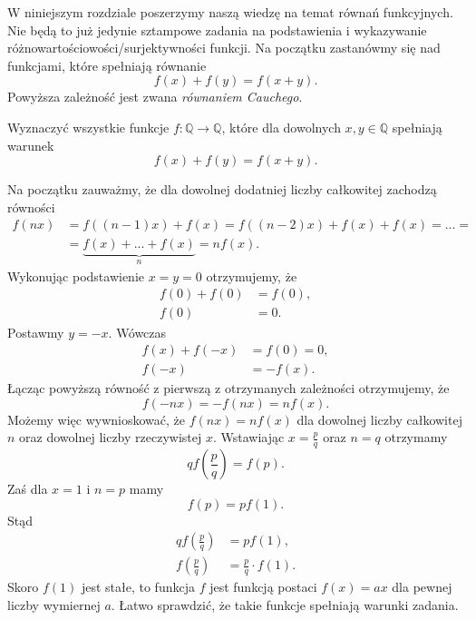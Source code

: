 

\noindent
W niniejszym rozdziale poszerzymy naszą wiedzę na temat równań funkcyjnych. Nie będą to już jedynie sztampowe zadania na podstawienia i wykazywanie różnowartościowości/surjektywności funkcji. Na początku zastanówmy się nad funkcjami, które spełniają równanie
\[
	f(x) + f(y) = f(x + y).
\]
Powyższa zależność jest zwana \textit{równaniem Cauchego}.

\vspace{10px}


\noindent
Wyznaczyć wszystkie funkcje $f:\mathbb{Q}\longrightarrow\mathbb{Q}$, które dla dowolnych $x, y \in \mathbb{Q}$ spełniają warunek
\[
	f(x) + f(y) = f(x + y).
\]


\noindent
Na początku zauważmy, że dla dowolnej dodatniej liczby całkowitej zachodzą równości
\begin{align*}
	f(nx) &= f((n - 1)x) + f(x) = f((n - 2)x) + f(x) + f(x) = ... = \\
	&=  \underbrace{f(x) + ... + f(x)}_{n} = nf(x).
\end{align*}
Wykonując podstawienie $x = y = 0$ otrzymujemy, że
\begin{align*}
	f(0) + f(0) &= f(0), \\
	f(0) &= 0.
\end{align*}
Postawmy $y = -x$. Wówczas
\begin{align*}
	f(x) + f(-x) &= f(0) = 0, \\
	f(-x) &= -f(x).
\end{align*}
Łącząc powyższą równość z pierwszą z otrzymanych zależności otrzymujemy, że
\[
	f(-nx) = -f(nx) = nf(x).
\]
Możemy więc wywnioskować, że $f(nx) 
= nf(x)$ dla dowolnej liczby całkowitej $n$ oraz dowolnej liczby rzeczywistej $x$. Wstawiając $x = \frac{p}{q}$ oraz $n = q$ otrzymamy
\[
	qf\left(\frac{p}{q}\right) = f(p).
\]
Zaś dla $x = 1$ i $n = p$ mamy
\[
	f(p) = pf(1).
\]
Stąd
\begin{align*}
	qf\left(\frac{p}{q}\right) &= pf(1), \\
	f\left(\frac{p}{q}\right) &= \frac{p}{q} \cdot f(1).
\end{align*}
Skoro $f(1)$ jest stałe, to funkcja $f$ jest funkcją postaci $f(x) = ax$ dla pewnej liczby wymiernej $a$. Łatwo sprawdzić, że takie funkcje spełniają warunki zadania.


